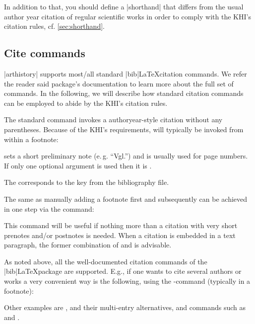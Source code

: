 \documentclass[a4paper,
10pt,
ngerman,
english
]{ltxdoc}
\begin{document}
In addition to that, you should define a |shorthand| that differs from the usual author year citation of regular scientific works in order to comply with the KHI's citation rules, cf. \cref{sec:shorthand}.


\subsection{Cite commands}\label{cite-commands}
|arthistory| supports most/all standard |bib|\LaTeX citation commands. We refer the reader said package's documentation to learn more about the full set of commands. In the following, we will describe how standard citation commands can be employed to abide by the KHI's citation rules.


\DescribeMacro{\cite}%
The standard  command invokes a authoryear-style citation without any parentheses. Because of the KHI's requirements,  will typically be invoked from within a footnote:

 sets a short preliminary note (e.\,g. \enquote{Vgl.}) and  is usually used for page numbers.
If only one optional argument is used then it is .
The  corresponds to the key from the bibliography file.

\DescribeMacro{\footcite}
The same as manually adding a footnote first and  subsequently can be achieved in one step via the  command:
This command will be useful if nothing more than a citation with very short prenotes and/or postnotes is needed. When a citation is embedded in a text paragraph, the former combination of  and  is advisable.

As noted above, all the well-documented citation commands of the |bib|\LaTeX package are supported.
\DescribeMacro{\cites}
E.g., if one wants to cite several authors or works a very convenient way is the following, using the -command (typically in a footnote):
Other examples are , and their multi-entry alternatives, and commands such as  and .
\end{document}
